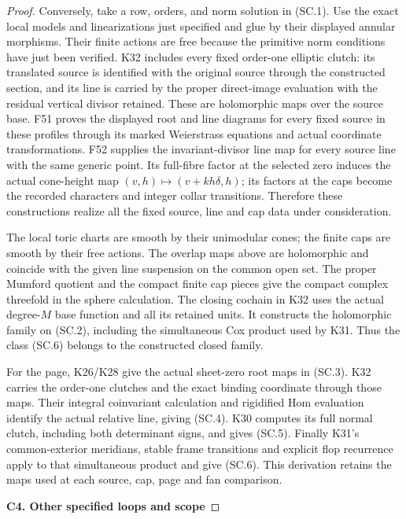 \begin{proof}
Conversely, take a row, orders, and norm solution
in (SC.1). Use the exact local models and
linearizations just specified and glue by their
displayed annular morphisms. Their finite actions
are free because the primitive norm conditions
have just been verified. K32 includes every
fixed order-one elliptic clutch: its translated
source is identified with the original source
through the constructed section, and its line
is carried by the proper direct-image evaluation
with the residual vertical divisor retained.
These are holomorphic maps over the source base.
F51 proves the displayed root and line diagrams
for every fixed source in these profiles through
its marked Weierstrass equations and actual
coordinate transformations. F52 supplies the
invariant-divisor line map for every source line
with the same generic point. Its full-fibre
factor at the selected zero induces the actual
cone-height map
\((v,h)\mapsto(v+kh\delta,h)\); its factors at
the caps become the recorded characters and
integer collar transitions. Therefore these
constructions realize all the fixed source,
line and cap data under consideration.

The local toric charts are smooth by their
unimodular cones; the finite caps are smooth
by their free actions. The overlap maps above
are holomorphic and coincide with the given
line suspension on the common open set.
The proper Mumford quotient and the compact
finite cap pieces give the compact complex
threefold in the sphere calculation. The
closing cochain in K32 uses the actual
degree-\(M\) base function and all its retained
units. It constructs the holomorphic family
on (SC.2), including the simultaneous Cox
product used by K31. Thus the class (SC.6)
belongs to the constructed closed family.

For the page, K26/K28 give the actual
sheet-zero root maps in (SC.3). K32 carries
the order-one clutches and the exact
binding coordinate through those maps.
Their integral coinvariant calculation and
rigidified Hom evaluation identify the
actual relative line, giving (SC.4).
K30 computes its full normal clutch,
including both determinant signs, and
gives (SC.5). Finally K31's common-exterior
meridians, stable frame transitions and
explicit flop recurrence apply to that
simultaneous product and give (SC.6).
This derivation retains the maps used at
each source, cap, page and fan comparison.

\par

\medskip\noindent\textbf{C4. Other specified loops and scope}


\end{proof}
